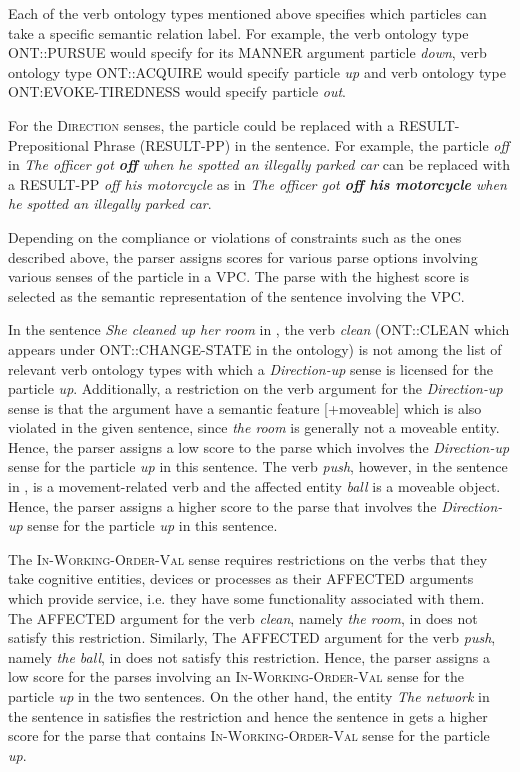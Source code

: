 \documentclass[output=paper
,modfonts
,nonflat]{langsci/langscibook}
\begin{document}
Each of the verb ontology types mentioned above specifies which particles can take a specific semantic relation label. For example, the verb ontology type ONT::PURSUE would specify for its MANNER argument particle \textit{down}, verb ontology type ONT::ACQUIRE would specify particle \textit{up} and verb ontology type ONT:EVOKE-TIREDNESS would specify particle \textit{out}.  

For the \textsc{Direction} senses, the particle could be replaced with a RESULT-Pre\-po\-si\-tional Phrase (RESULT-PP) in the sentence. For example, the particle \textit{off} in \textit{The officer got \textbf{off} when he spotted an illegally parked car} can be replaced with a RESULT-PP \textit{off his motorcycle} as in \textit{The officer got \textbf{off his motorcycle} when he spotted an illegally parked car}.

Depending on the compliance or violations of constraints such as the ones described above, the parser assigns scores for various parse options involving various senses of the particle in a VPC. The parse with the highest score is selected as the semantic representation of the sentence involving the VPC.

In the sentence \textit{She cleaned up her room} in , the verb \textit{clean} (ONT::CLEAN which appears under ONT::CHANGE-STATE in the ontology) is not among the list of relevant verb ontology types with which a \textit{Direction-up} sense is licensed for the particle \textit{up}. Additionally, a restriction on the verb argument for the \textit{Direction-up} sense is that the argument have a semantic feature [+moveable] which is also violated in the given sentence, since \textit{the room} is generally not a moveable entity. Hence, the parser assigns a low score to the parse which involves the \textit{Direction-up} sense for the particle \textit{up} in this sentence. The verb \textit{push}, however, in the sentence in , is a movement-related verb and the affected entity \textit{ball} is a moveable object. Hence, the parser assigns a higher score to the parse that involves the \textit{Direction-up} sense for the particle \textit{up} in this sentence.

The \textsc{In-Working-Order-Val} sense requires restrictions on the verbs that they take cognitive entities, devices or processes as their AFFECTED arguments which provide service, i.e. they have some functionality associated with them. The AFFECTED argument for the verb \textit{clean}, namely \textit{the room}, in  does not satisfy this restriction. Similarly, The AFFECTED argument for the verb \textit{push}, namely \textit{the ball}, in  does not satisfy this restriction. Hence, the parser assigns a low score for the parses involving an \textsc{In-Working-Order-Val} sense for the particle \textit{up} in the two sentences. On the other hand, the entity \textit{The network} in the sentence in  satisfies the restriction and hence the sentence in  gets a higher score for the parse that contains \textsc{In-Working-Order-Val} sense for the particle \textit{up}. 
\end{document}
